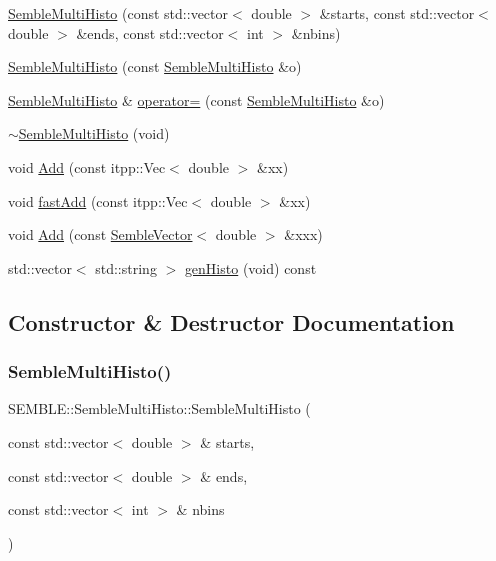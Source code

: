 \begin{DoxyCompactItemize}
\mbox{\hyperlink{structSEMBLE_1_1SembleMultiHisto_a3af7e8644faef45ba4935e8358785b1c}{Semble\+Multi\+Histo}} (const std\+::vector$<$ double $>$ \&starts, const std\+::vector$<$ double $>$ \&ends, const std\+::vector$<$ int $>$ \&nbins)
\item 
\mbox{\hyperlink{structSEMBLE_1_1SembleMultiHisto_ac8c7e221a826f9ce9c7f85764651e05b}{Semble\+Multi\+Histo}} (const \mbox{\hyperlink{structSEMBLE_1_1SembleMultiHisto}{Semble\+Multi\+Histo}} \&o)
\item 
\mbox{\hyperlink{structSEMBLE_1_1SembleMultiHisto}{Semble\+Multi\+Histo}} \& \mbox{\hyperlink{structSEMBLE_1_1SembleMultiHisto_a162bdd7d482c65d106b623d7a240f556}{operator=}} (const \mbox{\hyperlink{structSEMBLE_1_1SembleMultiHisto}{Semble\+Multi\+Histo}} \&o)
\item 
\mbox{\hyperlink{structSEMBLE_1_1SembleMultiHisto_ad20ae462e00c5340d2fad66630e7bb64}{$\sim$\+Semble\+Multi\+Histo}} (void)
\item 
void \mbox{\hyperlink{structSEMBLE_1_1SembleMultiHisto_a45e4394dec6ca6da040f45088e9484fe}{Add}} (const itpp\+::\+Vec$<$ double $>$ \&xx)
\item 
void \mbox{\hyperlink{structSEMBLE_1_1SembleMultiHisto_a8920593b2e66684dda381c02d586197c}{fast\+Add}} (const itpp\+::\+Vec$<$ double $>$ \&xx)
\item 
void \mbox{\hyperlink{structSEMBLE_1_1SembleMultiHisto_ac3f1fb8049db01afbfb7152bc98f7db3}{Add}} (const \mbox{\hyperlink{structSEMBLE_1_1SembleVector}{Semble\+Vector}}$<$ double $>$ \&xxx)
\item 
std\+::vector$<$ std\+::string $>$ \mbox{\hyperlink{structSEMBLE_1_1SembleMultiHisto_a2b7095234ec9ace27712e559ba6bf530}{gen\+Histo}} (void) const
\end{DoxyCompactItemize}


\subsection{Constructor \& Destructor Documentation}
\mbox{\label{structSEMBLE_1_1SembleMultiHisto_a3af7e8644faef45ba4935e8358785b1c}} 
\subsubsection{\texorpdfstring{SembleMultiHisto()}{SembleMultiHisto()}\hspace{0.1cm}{\footnotesize\ttfamily [1/4]}}
{\footnotesize\ttfamily S\+E\+M\+B\+L\+E\+::\+Semble\+Multi\+Histo\+::\+Semble\+Multi\+Histo (\begin{DoxyParamCaption}\item[{const std\+::vector$<$ double $>$ \&}]{starts,  }\item[{const std\+::vector$<$ double $>$ \&}]{ends,  }\item[{const std\+::vector$<$ int $>$ \&}]{nbins }\end{DoxyParamCaption})}


